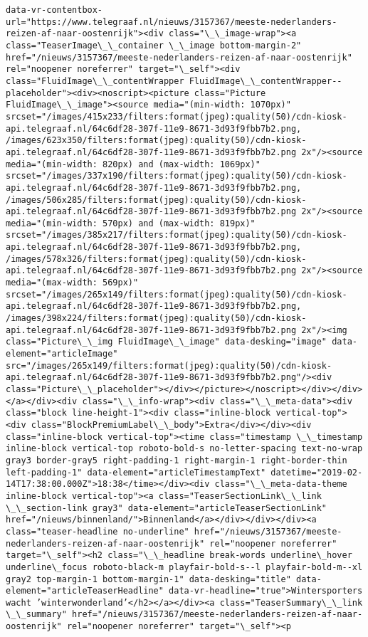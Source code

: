 \documentclass[11pt]{article}
\begin{document}
\begin{Verbatim}[commandchars=\\\{\}]
data-vr-contentbox-url="https://www.telegraaf.nl/nieuws/3157367/meeste-nederlanders-reizen-af-naar-oostenrijk"><div class="\_\_image-wrap"><a class="TeaserImage\_\_container \_\_image bottom-margin-2" href="/nieuws/3157367/meeste-nederlanders-reizen-af-naar-oostenrijk" rel="noopener noreferrer" target="\_self"><div class="FluidImage\_\_contentWrapper FluidImage\_\_contentWrapper--placeholder"><div><noscript><picture class="Picture FluidImage\_\_image"><source media="(min-width: 1070px)" srcset="/images/415x233/filters:format(jpeg):quality(50)/cdn-kiosk-api.telegraaf.nl/64c6df28-307f-11e9-8671-3d93f9fbb7b2.png, /images/623x350/filters:format(jpeg):quality(50)/cdn-kiosk-api.telegraaf.nl/64c6df28-307f-11e9-8671-3d93f9fbb7b2.png 2x"/><source media="(min-width: 820px) and (max-width: 1069px)" srcset="/images/337x190/filters:format(jpeg):quality(50)/cdn-kiosk-api.telegraaf.nl/64c6df28-307f-11e9-8671-3d93f9fbb7b2.png, /images/506x285/filters:format(jpeg):quality(50)/cdn-kiosk-api.telegraaf.nl/64c6df28-307f-11e9-8671-3d93f9fbb7b2.png 2x"/><source media="(min-width: 570px) and (max-width: 819px)" srcset="/images/385x217/filters:format(jpeg):quality(50)/cdn-kiosk-api.telegraaf.nl/64c6df28-307f-11e9-8671-3d93f9fbb7b2.png, /images/578x326/filters:format(jpeg):quality(50)/cdn-kiosk-api.telegraaf.nl/64c6df28-307f-11e9-8671-3d93f9fbb7b2.png 2x"/><source media="(max-width: 569px)" srcset="/images/265x149/filters:format(jpeg):quality(50)/cdn-kiosk-api.telegraaf.nl/64c6df28-307f-11e9-8671-3d93f9fbb7b2.png, /images/398x224/filters:format(jpeg):quality(50)/cdn-kiosk-api.telegraaf.nl/64c6df28-307f-11e9-8671-3d93f9fbb7b2.png 2x"/><img class="Picture\_\_img FluidImage\_\_image" data-desking="image" data-element="articleImage" src="/images/265x149/filters:format(jpeg):quality(50)/cdn-kiosk-api.telegraaf.nl/64c6df28-307f-11e9-8671-3d93f9fbb7b2.png"/><div class="Picture\_\_placeholder"></div></picture></noscript></div></div></a></div><div class="\_\_info-wrap"><div class="\_\_meta-data"><div class="block line-height-1"><div class="inline-block vertical-top"><div class="BlockPremiumLabel\_\_body">Extra</div></div><div class="inline-block vertical-top"><time class="timestamp \_\_timestamp inline-block vertical-top roboto-bold-s no-letter-spacing text-no-wrap gray3 border-gray5 right-padding-1 right-margin-1 right-border-thin left-padding-1" data-element="articleTimestampText" datetime="2019-02-14T17:38:00.000Z">18:38</time></div><div class="\_\_meta-data-theme inline-block vertical-top"><a class="TeaserSectionLink\_\_link \_\_section-link gray3" data-element="articleTeaserSectionLink" href="/nieuws/binnenland/">Binnenland</a></div></div></div><a class="teaser-headline no-underline" href="/nieuws/3157367/meeste-nederlanders-reizen-af-naar-oostenrijk" rel="noopener noreferrer" target="\_self"><h2 class="\_\_headline break-words underline\_hover underline\_focus roboto-black-m playfair-bold-s--l playfair-bold-m--xl gray2 top-margin-1 bottom-margin-1" data-desking="title" data-element="articleTeaserHeadline" data-vr-headline="true">Wintersporters wacht ’winterwonderland’</h2></a></div><a class="TeaserSummary\_\_link \_\_summary" href="/nieuws/3157367/meeste-nederlanders-reizen-af-naar-oostenrijk" rel="noopener noreferrer" target="\_self"><p 
\end{Verbatim}
\end{document}
